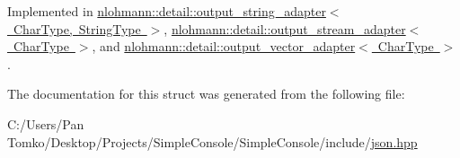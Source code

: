 Implemented in \mbox{\hyperlink{classnlohmann_1_1detail_1_1output__string__adapter_ab5ea4da075305d225dfd84ad997e8747}{nlohmann\+::detail\+::output\+\_\+string\+\_\+adapter$<$ Char\+Type, String\+Type $>$}}, \mbox{\hyperlink{classnlohmann_1_1detail_1_1output__stream__adapter_ad61375497a7d03cb0bdcddfdaad185d0}{nlohmann\+::detail\+::output\+\_\+stream\+\_\+adapter$<$ Char\+Type $>$}}, and \mbox{\hyperlink{classnlohmann_1_1detail_1_1output__vector__adapter_ad6f6c461dec7bedd5359454dc22fc9aa}{nlohmann\+::detail\+::output\+\_\+vector\+\_\+adapter$<$ Char\+Type $>$}}.



The documentation for this struct was generated from the following file\+:\begin{DoxyCompactItemize}
\item 
C\+:/\+Users/\+Pan Tomko/\+Desktop/\+Projects/\+Simple\+Console/\+Simple\+Console/include/\mbox{\hyperlink{json_8hpp}{json.\+hpp}}\end{DoxyCompactItemize}
